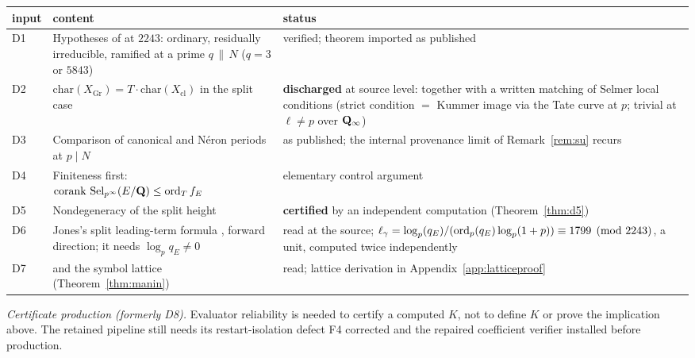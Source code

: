 \begin{longtable}{@{}p{}p{}p{}@{}}
\toprule
input & content & status\\ \midrule
D1 & Hypotheses of \cite[Thm.~A]{skinner} at $2243$: ordinary, residually irreducible, ramified at a prime $q\,\|\,N$ ($q=3$ or $5843$) & verified; theorem imported as published\\
D2 & $\mathrm{char}(X_{\mathrm{Gr}})=T\cdot\mathrm{char}(X_{\mathrm{cl}})$ in the split case & \textbf{discharged} at source level: \cite[\S3.2]{skinner} together with a written matching of Selmer local conditions (strict condition $=$ Kummer image via the Tate curve at $p$; trivial at $\ell\ne p$ over $\mathbf{Q}_\infty$)\\
D3 & Comparison of canonical and N\'eron periods at $p\mid N$ & as published; the internal provenance limit of Remark~\ref{rem:su} recurs\\
D4 & Finiteness first: $\mathrm{corank}\,\operatorname{Sel}_{p^\infty}(E/\mathbf{Q})\le\operatorname{ord}_Tf_E$ & elementary control argument\\
D5 & Nondegeneracy of the split height & \textbf{certified} by an independent computation (Theorem~\ref{thm:d5})\\
D6 & Jones's split leading-term formula \cite[Thm.~3.1]{jones}, forward direction; it needs $\log_p q_E\ne0$ & read at the source; $\ell_\gamma=\log_p(q_E)/(\operatorname{ord}_p(q_E)\log_p(1+p))\equiv1799\pmod{2243}$, a unit, computed twice independently\\
D7 & \cite[Prop.~3.5]{sw} and the symbol lattice (Theorem~\ref{thm:manin}) & read; lattice derivation in Appendix~\ref{app:latticeproof}\\ \bottomrule
\end{longtable}
\emph{Certificate production (formerly D8).} Evaluator reliability is needed to certify a computed $K$, not to define $K$ or prove the implication above. The retained pipeline still needs its restart-isolation defect F4 corrected and the repaired coefficient verifier installed before production.

